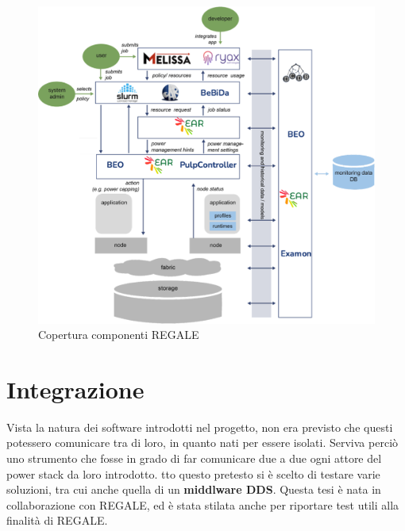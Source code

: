 \begin{figure}[H]
    \centering
    \includegraphics[width=\textwidth]{./img/REGALE_USE.png}
    \caption{Copertura componenti REGALE}
    \label{fig:regale_cover}
\end{figure}

\section{Integrazione}
Vista la natura dei software introdotti nel progetto, non era previsto che questi potessero comunicare tra di loro, in quanto nati per essere isolati. Serviva perciò uno strumento che fosse in grado di far comunicare due a due ogni attore del power stack da loro introdotto. 
tto questo pretesto si è scelto di testare varie soluzioni, tra cui anche quella di un \textbf{middlware DDS}. Questa tesi è nata in collaborazione con REGALE, ed è stata stilata anche per riportare test utili alla finalità di REGALE.